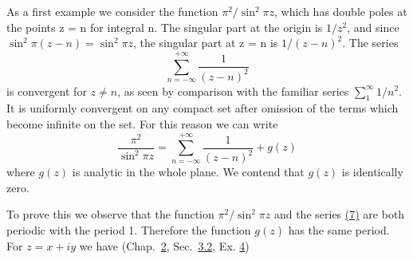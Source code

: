 As a first example we consider the function $\pi^{2}/\sin^{2}\pi z$, which has double poles at the points z = n for integral n. The singular part at the origin is $1/z^{2}$, and since $\sin^{2}\pi(z - n) = \sin^{2}\pi z$, the singular part at z = n is $1/(z - n)^{2}$. The series
\begin{equation*}
\sum_ {n = - \infty} ^ {+ \infty} \frac {1}{(z - n) ^ {2}}\tag{7}\label{eq:5.7}
\end{equation*}
is convergent for $z \neq n$, as seen by comparison with the familiar series $\sum_{1}^{\infty} 1/n^{2}$. It is uniformly convergent on any compact set after omission of the terms which become infinite on the set. For this reason we can write
\begin{equation*}
{\frac {\pi^ {2}}{\sin^ {2} \pi z}} = \sum_ {n = - \infty} ^ {+ \infty} {\frac {1}{(z - n) ^ {2}}} + g (z)\tag{8}\label{eq:5.8}
\end{equation*}
where $g(z)$ is analytic in the whole plane. We contend that $g(z)$ is identically zero.

To prove this we observe that the function $\pi^{2}/\sin^{2}\pi z$ and the series \hyperref[eq:5.7]{(7)} are both periodic with the period 1. Therefore the function $g(z)$ has the same period. For $z = x + iy$ we have (Chap.~\hyperref[chap:2]{2}, Sec.~\hyperref[sec:2.3.2]{3.2}, Ex. \hyperref[exercise:2.3.2.5.4]{4})


